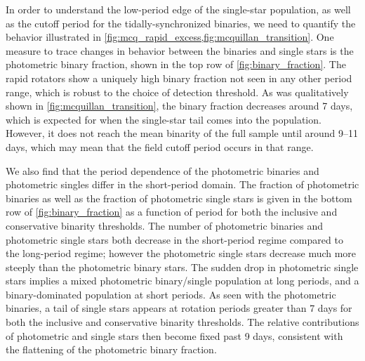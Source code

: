 \documentclass[manuscript]{aastex6}
\begin{document}
\begin{figure*}[htb]
    \centering
    \caption{\emph{Top Left:} The photometric binary fraction as a function of 
        period for the inclusive vertical displacement threshold (\(\Delta K <
        -0.2\) mag). The photometric binary fraction
        for the full sample analyzed by \citet{McQuillan14} is shown as the
        dotted line. Error bars are \(1 \sigma\) binomial confidence
        intervals. \emph{Top Right:} Same as the previous plot, except using
        the more conservative threshold (\(\Delta K < -0.3\) mag). \emph{Bottom
        left:} The period distribution of the photometric binary (solid green) 
        and photometric single (dashed purple) samples, each normalized by the 
        total number of photometric binaries and photometric single stars 
        analyzed by \citet{McQuillan14}, respectively, using the inclusive
        vertical displacement threshold. \emph{Bottom Right:}
        Same as the previous plot, except with the more conservative vertical
        displacement threshold. Error bars are 1-\(\sigma\) Poisson confidence 
    intervals.}\label{fig:binary_fraction}
\end{figure*}

In order to understand the low-period edge of the single-star population, as
well as the cutoff period for the tidally-synchronized binaries, we need to
quantify the behavior illustrated in
\cref{fig:mcq_rapid_excess,fig:mcquillan_transition}. One measure to trace
changes in behavior between the binaries and single stars is the photometric
binary fraction, shown in the top row of \cref{fig:binary_fraction}. The rapid 
rotators show a uniquely high binary fraction not seen in any other period 
range, which is robust to the choice of detection threshold. As was 
qualitatively shown in \cref{fig:mcquillan_transition}, the binary fraction 
decreases around 7 days, which is expected for when the single-star tail comes 
into the population. However, it does not reach the mean binarity of the full 
sample until around 9--11 days, which may mean that the field cutoff period
occurs in that range.

We also find that the period dependence of the photometric binaries and
photometric singles differ in the short-period domain. The fraction of
photometric binaries as well as the fraction of
photometric single stars is given in the bottom row of
\cref{fig:binary_fraction} as a function of period for both the inclusive and 
conservative binarity thresholds. The number of photometric binaries and 
photometric single stars both decrease in the short-period regime compared to the 
long-period regime; however the photometric single stars decrease much more 
steeply than the photometric binary stars. The sudden drop in photometric 
single stars implies a mixed photometric binary/single population at long 
periods, and a binary-dominated population at short periods. As seen with the
photometric binaries, a tail of 
single stars appears at rotation periods greater than 7 days for both the 
inclusive and conservative binarity thresholds. The relative contributions of 
photometric and single stars then become fixed past 9 days, consistent with 
the flattening of the photometric binary fraction. 
\end{document}
